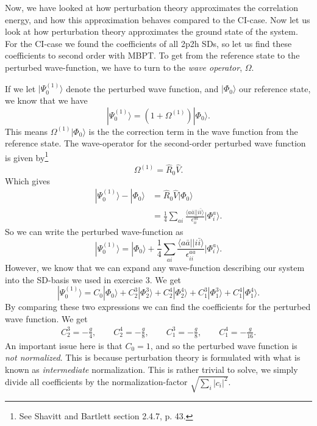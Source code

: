 \documentclass[a4paper, 11pt, notitlepage, english]{article}
\newcommand{\ket}[1]{|#1 \rangle}
\newcommand{\brakket}[2]{\langle #1 || #2 \rangle}
\newcommand{\op}[1]{\hat{#1}}
\newcommand{\eps}{\epsilon}
\begin{document}
Now, we have looked at how perturbation theory approximates the correlation energy, and how this approximation behaves compared to the CI-case. Now let us look at how perturbation theory approximates the ground state of the system. For the CI-case we found the coefficients of all 2p2h SDs, so let us find these coefficients to second order with MBPT. To get from the reference state to the perturbed wave-function, we have to turn to the \emph{wave operator}, $\Omega$.

If we let $\ket{\Psi^{(1)}_0}$ denote the perturbed wave function, and $\ket{\Phi_0}$ our reference state, we know that we have
$$\ket{\Psi^{(1)}_0} = (1 + \Omega^{(1)})\ket{\Phi_0}.$$
This means $\Omega^{(1)}\ket{\Phi_0}$ is the the correction term in the wave function from the reference state. The wave-operator for the second-order perturbed wave function is given by\footnote{See Shavitt and Bartlett section 2.4.7, p. 43.}
$$\Omega^{(1)} = \op{R}_0 \op{V}.$$
Which gives
\begin{align*}
\ket{\Psi^{(1)}_0} - \ket{\Phi_0} &= \op{R}_0 \op{V}\ket{\Phi_0} \\
&= \frac{1}{4}\sum_{ai} \frac{\brakket{a\bar{a}}{i\bar{i}}}{\eps_{ii}^{aa}}\ket{\Phi_{i}^{a}}.
\end{align*}
So we can write the perturbed wave-function as
$$\ket{\Psi^{(1)}_0} = \ket{\Phi_0} + \frac{1}{4}\sum_{ai} \frac{\brakket{a\bar{a}}{i\bar{i}}}{\eps_{ii}^{aa}}\ket{\Phi_{i}^{a}}.$$
However, we know that we can expand any wave-function describing our system into the SD-basis we used in exercise 3. We get
$$\ket{\Psi^{(1)}_0} = C_0\ket{\Phi_0} + C_2^3\ket{\Phi_2^3} + C_2^4\ket{\Phi_2^4} + C_1^3\ket{\Phi_1^3} + C_1^4\ket{\Phi_1^4}.$$
By comparing these two expressions we can find the coefficients for the perturbed wave function. We get
\begin{align*}
C_2^3 = -\frac{g}{4}, \qquad C_2^4 = -\frac{g}{8}, \qquad C_1^3 = -\frac{g}{8}, \qquad C_1^4 = -\frac{g}{16}.
\end{align*}
An important issue here is that $C_0 = 1$, and so the perturbed wave function is \emph{not normalized}. This is because perturbation theory is formulated with what is known as \emph{intermediate} normalization. This is rather trivial to solve, we simply divide all coefficients by the normalization-factor $\sqrt{\sum_i |c_i|^2}$.
\end{document}
